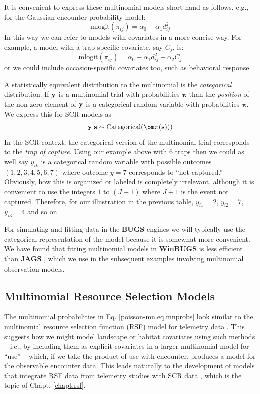It is convenient to express these multinomial models short-hand as
follows, e.g., for the Gaussian encounter probability model:
\[
\mbox{mlogit}( \pi_{ij} ) = \alpha_{0} - \alpha_{1} d_{ij}^{2}
\]
In this way we can refer to models with covariates in a more concise
way. For example, a model with a trap-specific covariate, say $C_{j}$, is:
\[
\mbox{mlogit}( \pi_{ij} ) = \alpha_{0} - \alpha_{1} d_{ij}^{2} + \alpha_{2} C_{j}
\]
or we could include occasion-specific covariates too, such as
behavioral response.

A statistically equivalent distribution to the multinomial is the {\it
  categorical} distribution.  If ${\bf y}$ is a multinomial trial with
probabilities ${\bm \pi}$ than the {\it position} of the non-zero
element of ${\bf y}$ is a categorical random variable with
probabilities ${\bm \pi}$.  We express this for SCR models as
\[
{\bf y}|{\bf s} \sim \mbox{Categorical}( {\bm \pi}({\bf s})) )
\]
In the SCR context, the categorical version of the multinomial trial
corresponds to the {\it trap of capture}.  Using our example above
with 6 traps then we could as well say $y_{ik}$ is a categorical
random variable with possible outcomes $(1,2,3,4,5,6,7)$ where outcome
$y=7$ corresponds to ``not captured.'' Obviously, how this is
organized or labeled is completely irrelevant, although it is
convenient to use the integers $1$ to $(J+1)$ where $J+1$ is the event
not captured.  Therefore, for our illustration in the previous table,
$y_{i1} = 2$, $y_{i2} = 7$, $y_{i3} = 4$ and so on.

For simulating and fitting data in the {\bf BUGS} engines we will
typically use the categorical representation of the model because it
is somewhat more convenient.  We have found that fitting multinomial
models in {\bf WinBUGS} is less efficient than {\bf JAGS}
\citep{royle_converse:2013}, which we use in the subsequent examples
involving multinomial observation models.


\subsection{Multinomial  Resource Selection Models}

The multinomial probabilities in Eq. \ref{poisson-mn.eq.mnprobs}
look similar to the
multinomial resource selection function (RSF) model for telemetry data
\citep{manly_etal:2002, lele_keim:2006}.  This suggests how we might
model landscape or habitat covariates using such methods -- i.e., by
including them as explicit covariates in a larger multinomial model
for ``use'' -- which, if we take the product of use with encounter,
produces a model for the observable encounter data. This
leads naturally to the development of models that integrate RSF data
from telemetry studies with SCR data
\citep{royle_etal:2012mee},
which is the topic of  Chapt. \ref{chapt.rsf}.




